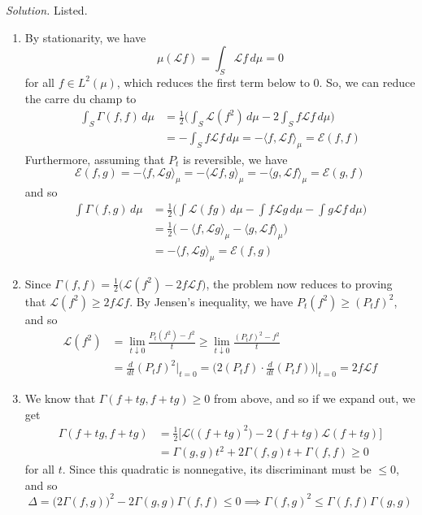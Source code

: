 \documentclass{article}
\theoremstyle{definition}
\theoremstyle{remark}
\theoremstyle{definition}
\newenvironment{solution}{\noindent \textit{Solution.}}{}
\begin{document}
\begin{solution}
Listed. 
\begin{enumerate}
    \item By stationarity, we have 
    \[\mu ( \mathscr{L} f) = \int_S \mathscr{L} f \, d\mu = 0\]
    for all $f \in L^2 (\mu)$, which reduces the first term below to $0$. So, we can reduce the carre du champ to 
    \begin{align*}
        \int_S \Gamma(f, f) \, d\mu & = \frac{1}{2} \bigg( \int_S \mathscr{L} (f^2) \, d\mu - 2 \int_S f \mathscr{L} f \, d\mu \bigg) \\
        & = - \int_S f \mathscr{L} f \, d\mu = - \langle f, \mathscr{L} f \rangle_\mu = \mathcal{E}(f, f)
    \end{align*}
    Furthermore, assuming that $P_t$ is reversible, we have 
    \[\mathcal{E}(f, g) = - \langle f, \mathscr{L} g \rangle_\mu = -\langle \mathscr{L} f, g \rangle_\mu = - \langle g, \mathscr{L} f \rangle_\mu = \mathcal{E}(g, f)\]
    and so 
    \begin{align*}
        \int \Gamma (f, g) \, d\mu & = \frac{1}{2} \bigg( \int \mathscr{L}(f g) \, d\mu - \int f \mathscr{L} g \, d\mu - \int g \mathscr{L} f \, d\mu \bigg) \\
        & = \frac{1}{2} \big( - \langle f, \mathscr{L} g \rangle_\mu - \langle g, \mathscr{L} f\rangle_\mu \big) \\
        & = - \langle f, \mathscr{L} g \rangle_\mu = \mathcal{E}(f, g)
    \end{align*}
    
    \item Since $\Gamma(f, f) = \frac{1}{2} \big( \mathscr{L} (f^2) - 2 f \mathscr{L}f \big)$, the problem now reduces to proving that $\mathscr{L} (f^2) \geq 2 f \mathscr{L}f$. By Jensen's inequality, we have $P_t (f^2) \geq (P_t f)^2$, and so 
    \begin{align*}
        \mathscr{L}(f^2) & = \lim_{t \downarrow 0} \frac{P_t (f^2) - f^2}{t} \geq \lim_{t \downarrow 0} \frac{(P_t f)^2 - f^2}{t} \\
        & = \frac{d}{dt} (P_t f)^2 \bigg|_{t = 0} = \bigg( 2 (P_t f) \cdot \frac{d}{dt} (P_t f) \bigg)\bigg|_{t = 0} = 2 f \mathscr{L} f
    \end{align*}
    
    \item We know that $\Gamma(f + t g, f + tg) \geq 0$ from above, and so if we expand out, we get
    \begin{align*}
        \Gamma(f + t g, f + tg) & = \frac{1}{2} \Big[ \mathscr{L} \big( (f + t g)^2 \big) - 2 (f + t g) \mathscr{L}(f + t g) \Big] \\
        & = \Gamma(g, g) t^2 + 2 \Gamma (f, g) t + \Gamma(f, f) \geq 0 
    \end{align*}
    for all $t$. Since this quadratic is nonnegative, its discriminant must be $\leq 0$, and so 
    \[\Delta = \big( 2 \Gamma (f, g) \big)^2 - 2 \Gamma(g, g) \Gamma(f, f) \leq 0 \implies \Gamma(f, g)^2 \leq \Gamma(f, f) \Gamma(g, g)\]
    

\end{enumerate}
\end{solution}
\end{document}
